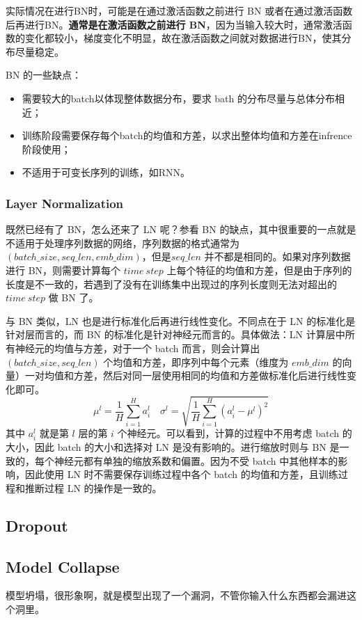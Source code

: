 实际情况在进行BN时，可能是在通过激活函数之前进行 BN 或者在通过激活函数后再进行BN。\textbf{通常是在激活函数之前进行 BN}，因为当输入较大时，通常激活函数的变化都较小，梯度变化不明显，故在激活函数之间就对数据进行BN，使其分布尽量稳定。

BN 的一些缺点：
\begin{itemize}
	\item 需要较大的batch以体现整体数据分布，要求 bath 的分布尽量与总体分布相近；
	\item 训练阶段需要保存每个batch的均值和方差，以求出整体均值和方差在infrence阶段使用；
	\item 不适用于可变长序列的训练，如RNN。
\end{itemize}

\subsubsection{Layer Normalization}
既然已经有了 BN，怎么还来了 LN 呢？参看 BN 的缺点，其中很重要的一点就是不适用于处理序列数据的网络，序列数据的格式通常为 $(batch\_size, seq\_len, emb\_dim)$，但是$seq\_len$ 并不都是相同的。如果对序列数据进行 BN，则需要计算每个 $time\ step$ 上每个特征的均值和方差，但是由于序列的长度是不一致的，若遇到了没有在训练集中出现过的序列长度则无法对超出的 $time\ step$ 做 BN 了。

与 BN 类似，LN 也是进行标准化后再进行线性变化。不同点在于 LN 的标准化是针对层而言的，而 BN 的标准化是针对神经元而言的。具体做法：LN 计算层中所有神经元的均值与方差，对于一个 batch 而言，则会计算出 $(batch\_size, seq\_len)$ 个均值和方差，即序列中每个元素（维度为 $emb\_dim$ 的向量）一对均值和方差，然后对同一层使用相同的均值和方差做标准化后进行线性变化即可。
$$
\mu^{l}=\frac{1}{H} \sum_{i=1}^{H} a_{i}^{l} \quad \sigma^{l}=\sqrt{\frac{1}{H} \sum_{i=1}^{H}\left(a_{i}^{l}-\mu^{l}\right)^{2}}
$$
其中 $a_i^l$ 就是第 $l$ 层的第 $i$ 个神经元。可以看到，计算的过程中不用考虑 batch 的大小，因此 batch 的大小和选择对 LN 是没有影响的。进行缩放时则与 BN 是一致的，每个神经元都有单独的缩放系数和偏置。因为不受 batch 中其他样本的影响，因此使用 LN 时不需要保存训练过程中各个 batch 的均值和方差，且训练过程和推断过程 LN 的操作是一致的。

\subsection{Dropout}

\subsection{Model Collapse}
模型坍塌，很形象啊，就是模型出现了一个漏洞，不管你输入什么东西都会漏进这个洞里。

